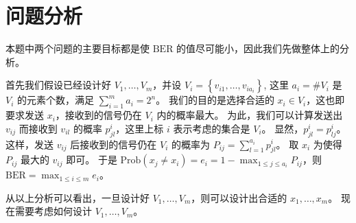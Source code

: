 \section{问题分析}

本题中两个问题的主要目标都是使 \(\mathrm{BER}\) 的值尽可能小，因此我们先做整体上的分析。

首先我们假设已经设计好 \(V_1,\dots,V_m\)，并设 \(V_i=\left\{v_{i1},\dots,v_{ia_i}\right\}\),
这里 \(a_i=\#V_i\) 是 \(V_i\) 的元素个数，满足 \(\sum_{i=1}^m a_i=2^n\)。
我们的目的是选择合适的 \(x_i\in V_i\)，这也即要求发送 \(x_i\)，接收到的信号仍在 \(V_i\) 内的概率最大。
为此，我们可以计算发送出 \(v_{ij}\) 而接收到 \(v_{il}\) 的概率 \(p^i_{jl}\)，这里上标 \(i\) 表示考虑的集合是 \(V_i\)。
显然，\(p^i_{jl}=p^i_{lj}\)。
这样，发送 \(v_{ij}\) 后接收到的信号仍在 \(V_i\) 的概率为 \(P_{ij}=\sum_{l=1}^{a_i}p^i_{jl}\)。
取 \(x_i\) 为使得 \(P_{ij}\) 最大的 \(v_{ij}\) 即可。
于是 \(\mathrm{Prob}\left(x_j\ne x_i\right)=e_i=1-\max_{1\le j\le a_i}P_{ij}\)，则 \(\mathrm{BER}=\max_{1\le i\le m}e_i\)。

从以上分析可以看出，一旦设计好 \(V_1,\dots,V_m\)，则可以设计出合适的 \(x_1,\dots,x_m\)。
现在需要考虑如何设计 \(V_1,\dots,V_m\)。